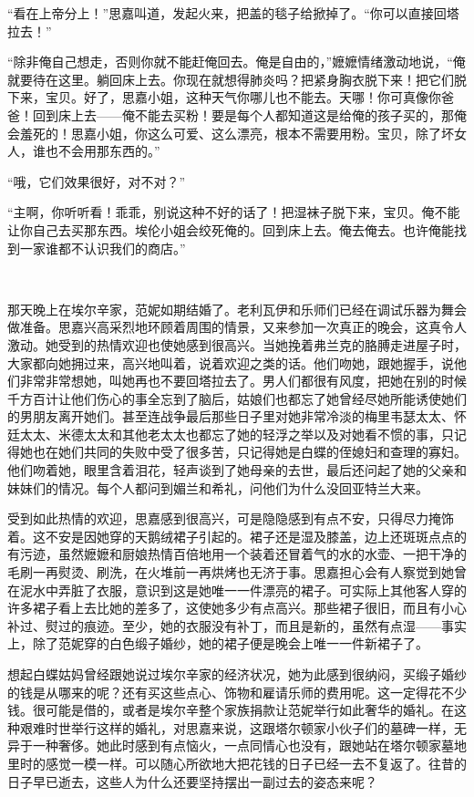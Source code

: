 \par “看在上帝分上！”思嘉叫道，发起火来，把盖的毯子给掀掉了。“你可以直接回塔拉去！”
\par “除非俺自己想走，否则你就不能赶俺回去。俺是自由的，”嬷嬷情绪激动地说，“俺就要待在这里。躺回床上去。你现在就想得肺炎吗？把紧身胸衣脱下来！把它们脱下来，宝贝。好了，思嘉小姐，这种天气你哪儿也不能去。天哪！你可真像你爸爸！回到床上去——俺不能去买粉！要是每个人都知道这是给俺的孩子买的，那俺会羞死的！思嘉小姐，你这么可爱、这么漂亮，根本不需要用粉。宝贝，除了坏女人，谁也不会用那东西的。”
\par “哦，它们效果很好，对不对？”
\par “主啊，你听听看！乖乖，别说这种不好的话了！把湿袜子脱下来，宝贝。俺不能让你自己去买那东西。埃伦小姐会绞死俺的。回到床上去。俺去俺去。也许俺能找到一家谁都不认识我们的商店。”
\par  
\par 那天晚上在埃尔辛家，范妮如期结婚了。老利瓦伊和乐师们已经在调试乐器为舞会做准备。思嘉兴高采烈地环顾着周围的情景，又来参加一次真正的晚会，这真令人激动。她受到的热情欢迎也使她感到很高兴。当她挽着弗兰克的胳膊走进屋子时，大家都向她拥过来，高兴地叫着，说着欢迎之类的话。他们吻她，跟她握手，说他们非常非常想她，叫她再也不要回塔拉去了。男人们都很有风度，把她在别的时候千方百计让他们伤心的事全忘到了脑后，姑娘们也都忘了她曾经尽她所能诱使她们的男朋友离开她们。甚至连战争最后那些日子里对她非常冷淡的梅里韦瑟太太、怀廷太太、米德太太和其他老太太也都忘了她的轻浮之举以及对她看不惯的事，只记得她也在她们共同的失败中受了很多苦，只记得她是白蝶的侄媳妇和查理的寡妇。他们吻着她，眼里含着泪花，轻声谈到了她母亲的去世，最后还问起了她的父亲和妹妹们的情况。每个人都问到媚兰和希礼，问他们为什么没回亚特兰大来。
\par 受到如此热情的欢迎，思嘉感到很高兴，可是隐隐感到有点不安，只得尽力掩饰着。这不安是因她穿的天鹅绒裙子引起的。裙子还是湿及膝盖，边上还斑斑点点的有污迹，虽然嬷嬷和厨娘热情百倍地用一个装着还冒着气的水的水壶、一把干净的毛刷一再熨烫、刷洗，在火堆前一再烘烤也无济于事。思嘉担心会有人察觉到她曾在泥水中弄脏了衣服，意识到这是她唯一一件漂亮的裙子。可实际上其他客人穿的许多裙子看上去比她的差多了，这使她多少有点高兴。那些裙子很旧，而且有小心补过、熨过的痕迹。至少，她的衣服没有补丁，而且是新的，虽然有点湿——事实上，除了范妮穿的白色缎子婚纱，她的裙子便是晚会上唯一一件新裙子了。
\par 想起白蝶姑妈曾经跟她说过埃尔辛家的经济状况，她为此感到很纳闷，买缎子婚纱的钱是从哪来的呢？还有买这些点心、饰物和雇请乐师的费用呢。这一定得花不少钱。很可能是借的，或者是埃尔辛整个家族捐款让范妮举行如此奢华的婚礼。在这种艰难时世举行这样的婚礼，对思嘉来说，这跟塔尔顿家小伙子们的墓碑一样，无异于一种奢侈。她此时感到有点恼火，一点同情心也没有，跟她站在塔尔顿家墓地里时的感觉一模一样。可以随心所欲地大把花钱的日子已经一去不复返了。往昔的日子早已逝去，这些人为什么还要坚持摆出一副过去的姿态来呢？
